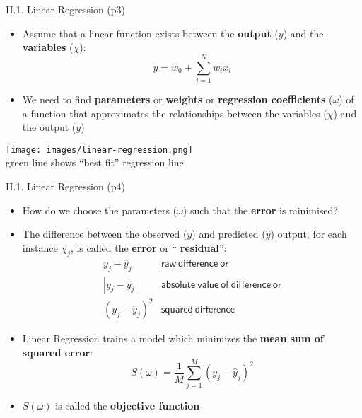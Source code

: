 \documentclass[handout]{beamer}
\newcommand{\strong}[1]{\textbf{\color{teal} #1}}
\newcommand{\stronger}[1]{\textbf{\color{purple} #1}}
\begin{document}
\begin{frame}{II.1. Linear Regression (p3)} 
\begin{itemize}
\item Assume that a linear function exists between the \strong{output} ($y$) and the \strong{variables} ($\chi$):
\[
y = w_0 + \sum^N_{i=1}{ w_i x_i }
\] 
\item We need to find \strong{parameters} or \strong{weights} or \strong{regression coefficients} ($\omega$) of a function that approximates the relationships between the variables ($\chi$) and the output ($y$)
\end{itemize}
\begin{center}
\texttt{[image: images/linear-regression.png]}\\
{\small green line shows ``best fit'' regression line}
\end{center}
\end{frame}
\begin{frame}{II.1. Linear Regression (p4)}
\begin{itemize}
\item How do we choose the parameters ($\omega$) such that the \strong{error} is minimised?
\item The difference between the observed ($y$) and predicted ($\hat{y}$) output, for each instance $\chi_j$, is called the \stronger{error} or ``\stronger{residual}'':
\[
\begin{array}{cl}
	y_j - \hat{y}_j     & \mathsf{raw ~ difference ~ or}\\
	| y_j - \hat{y}_j | & \mathsf{absolute ~ value ~ of ~ difference ~ or} \\
	(y_j - \hat{y}_j)^2 & \mathsf{squared ~ difference}
\end{array}
\]
\item Linear Regression trains a model which minimizes the \strong{mean sum of squared error}: 
\[
	S(\omega) = \frac{1}{M} \sum_{j=1}^M{ ( y_j - \hat{y}_j )^2 }
\]
\item $S(\omega)$ is called the \stronger{objective function}
\end{itemize}
\end{frame}
\end{document}
